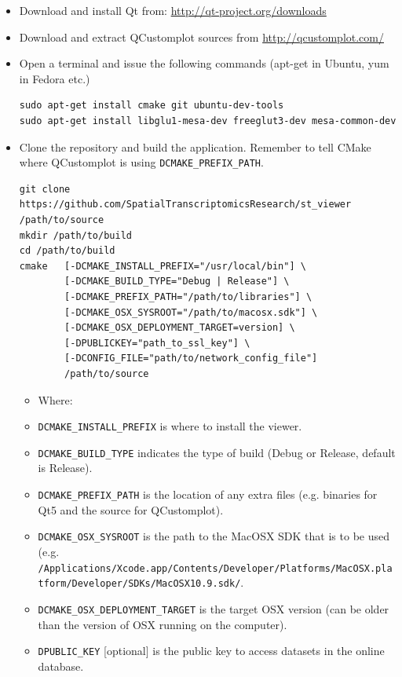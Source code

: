 \documentclass[10pt,a4paper,titlepage]{book}
\begin{document}
\begin{appendices}
\begin{itemize}[itemsep=10pt]
\item Download and install Qt from: \url{http://qt-project.org/downloads}
\item Download and extract QCustomplot sources from \url{http://qcustomplot.com/}
\item Open a terminal and issue the following commands (apt-get in Ubuntu, yum in Fedora etc.)
\begin{verbatim}
sudo apt-get install cmake git ubuntu-dev-tools
sudo apt-get install libglu1-mesa-dev freeglut3-dev mesa-common-dev
\end{verbatim}
\item Clone the repository and build the application. Remember to tell CMake where QCustomplot is using \texttt{DCMAKE\_PREFIX\_PATH}.
\vspace{1pt}
\begin{verbatim}
git clone https://github.com/SpatialTranscriptomicsResearch/st_viewer /path/to/source
mkdir /path/to/build
cd /path/to/build
cmake   [-DCMAKE_INSTALL_PREFIX="/usr/local/bin"] \
        [-DCMAKE_BUILD_TYPE="Debug | Release"] \
        [-DCMAKE_PREFIX_PATH="/path/to/libraries"] \
        [-DCMAKE_OSX_SYSROOT="/path/to/macosx.sdk"] \
        [-DCMAKE_OSX_DEPLOYMENT_TARGET=version] \
        [-DPUBLICKEY="path_to_ssl_key"] \
        [-DCONFIG_FILE="path/to/network_config_file"]
        /path/to/source
\end{verbatim}
\vspace{10pt}
\begin{itemize}
\item[] Where:
\item[] \texttt{DCMAKE\_INSTALL\_PREFIX} is where to install the viewer.
\item[] \texttt{DCMAKE\_BUILD\_TYPE} indicates the type of build (Debug or Release, default is Release).
\item[] \texttt{DCMAKE\_PREFIX\_PATH} is the location of any extra files (e.g. binaries for Qt5 and the source for QCustomplot).
\item[] \texttt{DCMAKE\_OSX\_SYSROOT} is the path to the MacOSX SDK that is to be used (e.g. \texttt{/Applications/Xcode.app/Contents/Developer/Platforms/MacOSX.platform/Developer/SDKs/MacOSX10.9.sdk/}.
\item[] \texttt{DCMAKE\_OSX\_DEPLOYMENT\_TARGET} is the target OSX version (can be older than the version of OSX running on the computer).
\item[] \texttt{DPUBLIC\_KEY} [optional] is the public key to access datasets in the online database.

\end{itemize}
\end{itemize}
\end{appendices}
\end{document}
